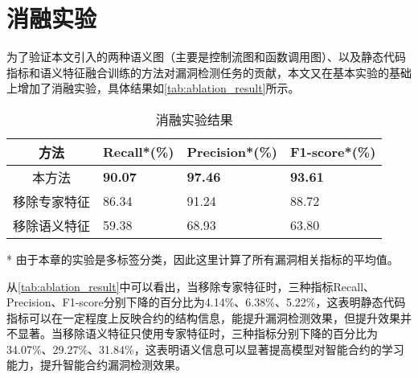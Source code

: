 \section{消融实验}
\label{sec:消融实验}
为了验证本文引入的两种语义图（主要是控制流图和函数调用图）、以及静态代码指标和语义特征融合训练的方法对漏洞检测任务的贡献，本文又在基本实验的基础上增加了消融实验，具体结果如\autoref{tab:ablation_result}所示。
\begin{table}[htbp]
    \caption{\label{tab:ablation_result}消融实验结果}
    \small
    \begin{threeparttable}{
    \renewcommand{\arraystretch}{1.5}
    \begin{tabularx}{\linewidth}{cX<{\centering}X<{\centering}X<{\centering}}
        \hline
        方法 & Recall*(\%) & Precision*(\%) & F1-score*(\%) \\
        \hline
        本方法 & \textbf{90.07} & \textbf{97.46} & \textbf{93.61} \\
        移除专家特征 & 86.34 & 91.24 & 88.72 \\
        移除语义特征 & 59.38 & 68.93 & 63.80 \\
        \hline
    \end{tabularx}
    }
    \begin{tablenotes}
        \footnotesize
        \item[*] 由于本章的实验是多标签分类，因此这里计算了所有漏洞相关指标的平均值。
    \end{tablenotes}
\end{threeparttable}
\end{table}
从\autoref{tab:ablation_result}中可以看出，当移除专家特征时，三种指标Recall、Precision、F1-score分别下降的百分比为4.14\%、6.38\%、5.22\%，这表明静态代码指标可以在一定程度上反映合约的结构信息，能提升漏洞检测效果，但提升效果并不显著。当移除语义特征只使用专家特征时，三种指标分别下降的百分比为34.07\%、29.27\%、31.84\%，这表明语义信息可以显著提高模型对智能合约的学习能力，提升智能合约漏洞检测效果。






